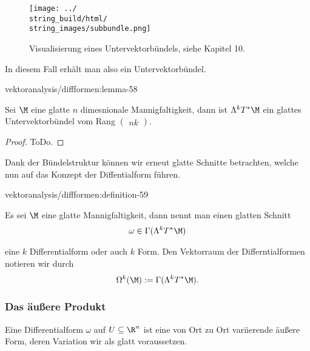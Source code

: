 \documentclass[letterpaper,10pt,english]{jupyterBook}
\begin{document}
\begin{figure}[htbp]
\centering


\noindent\texttt{[image: ../\\string\_build/html/\\string\_images/subbundle.png]}
\caption{Visualisierung eines Untervektorbündels, siehe \cite{Lee03} Kapitel 10.}\label{\detokenize{vektoranalysis/diffformen:fig-subbundle}}\end{figure}

\par
In diesem Fall erhält man also ein Untervektorbündel.
\begin{lemma}{}{vektoranalysis/diffformen:lemma-58}



\par
Sei \(\M\) eine glatte \(n\) dimesnionale Mannigfaltigkeit, dann ist \(\Lambda^k T^\ast\M\) ein glattes Untervektorbündel vom Rang \(\begin{pmatrix} n k \end{pmatrix}\).
\end{lemma}

\begin{proof}
 ToDo.
\end{proof}

\par
Dank der Bündelstruktur können wir erneut glatte Schnitte betrachten, welche nun auf das Konzept der Diffentialform führen.
\begin{definition}{}{vektoranalysis/diffformen:definition-59}



\par
Es sei \(\M\) eine glatte Mannigfaltigkeit, dann nennt man einen glatten Schnitt
\begin{align*}
\omega\in \Gamma(\Lambda^k T^\ast\M)
\end{align*}
\par
eine \(k\) Differentialform oder auch \(k\) Form. Den Vektorraum der Differntialformen notieren wir durch
\begin{align*}
\Omega^k(\M) := \Gamma(\Lambda^k T^\ast\M).
\end{align*}\end{definition}


\subsubsection{Das äußere Produkt}
\label{\detokenize{vektoranalysis/diffformen:das-auszere-produkt}}
\par
Eine Differentialform \(\omega\) auf \(U\subseteq\R^n\) ist eine von Ort zu Ort variierende äußere Form, deren Variation wir als glatt voraussetzen.
\end{document}
